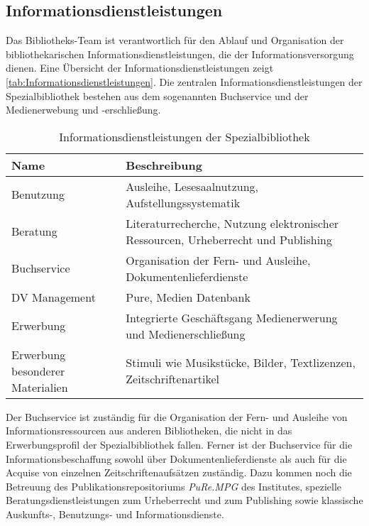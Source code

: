 \subsection{Informationsdienstleistungen}
Das Bibliotheks-Team ist verantwortlich für den Ablauf und Organisation der bibliothekarischen Informationsdienstleistungen, 
die der Informationsversorgung dienen. Eine Übersicht der Informationsdienstleistungen zeigt \autoref{tab:Informationsdienstleistungen}.
Die zentralen Informationsdienstleistungen der Spezialbibliothek bestehen aus dem sogenannten Buchservice und der Medienerwebung und -erschließung. 
\begingroup
\setlength{\tabcolsep}{12pt} %
\renewcommand{\arraystretch}{1.5} 
\begin{table}[h]
    \centering
    \begin{adjustbox}{max width=\textwidth}
    \begin{tabular}{p{}p{}}
       \toprule
       \textbf{Name}& \textbf{Beschreibung}\\
       \midrule
        Benutzung                               &Ausleihe, Lesesaalnutzung, Aufstellungssystematik\\
        Beratung                                &Literaturrecherche, Nutzung elektronischer Ressourcen, Urheberrecht und Publishing\\
        Buchservice                             &Organisation der Fern- und Ausleihe, Dokumentenlieferdienste\\
        DV Management                           &Pure, Medien Datenbank\\
        Erwerbung                               &Integrierte Geschäftsgang Medienerwerung und Medienerschließung\\
        Erwerbung besonderer Materialien        &Stimuli wie Musikstücke, Bilder, Textlizenzen, Zeitschriftenartikel\\       
       \bottomrule
    \end{tabular}
    \end{adjustbox}
    \caption{%
        Informationsdienstleistungen der Spezialbibliothek
    }
    \label{tab:Informationsdienstleistungen}
    \end{table}
\endgroup

Der Buchservice ist zuständig für die Organisation der Fern- und Ausleihe von Informationsressourcen 
aus anderen Bibliotheken, die nicht in das Erwerbungsprofil der Spezialbibliothek fallen. Ferner ist 
der Buchservice für die Informationsbeschaffung sowohl über Dokumentenlieferdienste als auch für die 
Acquise von einzelnen Zeitschriftenaufsätzen zuständig. Dazu kommen noch die Betreuung des Publikationsrepositoriums 
\textit{PuRe.MPG} des Institutes, spezielle Beratungsdienstleistungen zum Urheberrecht und zum Publishing 
sowie klassische Auskunfts-, Benutzungs- und Informationsdienste. 


